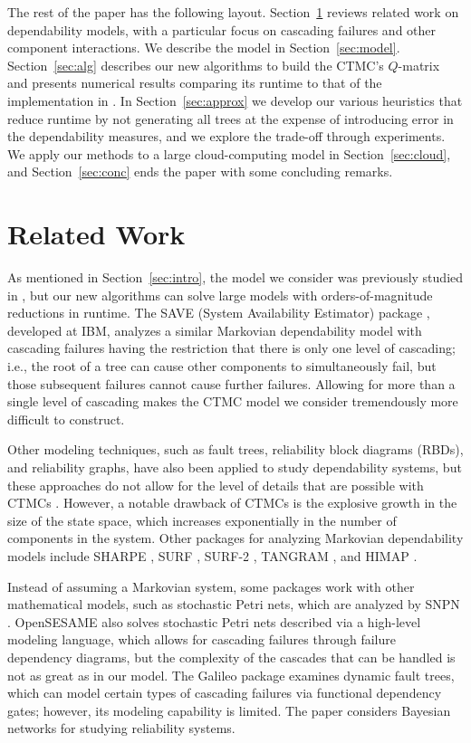 \documentclass[12pt]{article}
\begin{document}
The rest of the paper has the
following layout.
Section~\ref{sec:prior} reviews
related work on 
dependability models,
with a particular focus
on cascading failures
and other component interactions.
We describe the model
in Section~\ref{sec:model}.
Section~\ref{sec:alg} describes
our new algorithms to build
the CTMC's $Q$-matrix and presents
numerical results comparing its
runtime to that of the implementation
in \cite{ING:2009}.
In Section~\ref{sec:approx}
we develop our various heuristics
that reduce runtime by not
generating all trees at the
expense of introducing error
in the dependability measures,
and we explore the trade-off
through experiments.
We apply our methods to 
a large cloud-computing model
in Section~\ref{sec:cloud},
and Section~\ref{sec:conc}
ends the paper with some
concluding remarks.



\section{Related Work}
\label{sec:prior}

As mentioned in Section~\ref{sec:intro},
the model we consider was previously
studied in \cite{ING:2009}, but
our new algorithms can solve large
models with orders-of-magnitude
reductions in runtime.
The SAVE (System Availability Estimator)
package \cite{BHLNS:1994}, developed at IBM,
analyzes a similar Markovian dependability
model with cascading failures
having the restriction that there
is only one level of cascading;
i.e., the root of a tree can
cause other components to simultaneously
fail, but those subsequent failures
cannot cause further failures.
Allowing for more than a
single level of cascading
makes the CTMC model we consider
tremendously more
difficult to construct.

Other modeling techniques,
such as fault trees, reliability
block diagrams (RBDs), and reliability graphs,
have also been applied to study 
dependability systems, but these
approaches do not allow for 
the level of details that are
possible with CTMCs \cite{MFT:2000}.  
However,
a notable drawback of CTMCs is the
explosive growth in the size of the
state space, which increases exponentially
in the number of components in the system.
Other packages for analyzing Markovian
dependability models include
SHARPE \cite{STP:1996},
SURF \cite{Butl:1986},
SURF-2 \cite{SURF2:1993},
TANGRAM \cite{BSM:1991},
and HIMAP \cite{KGS:1996}.

Instead of assuming a Markovian
system, some packages work with
other mathematical models, such as
stochastic Petri nets,
which are analyzed by SNPN
\cite{HTT:2000}.
OpenSESAME \cite{WSB:2008}
also solves stochastic Petri nets
described via a high-level
modeling language, which allows
for cascading failures through
failure dependency diagrams,
but the complexity of the
cascades that can be handled is
not as great as in our model.
The Galileo package
\cite{SDC:1999}
examines dynamic fault trees,
which can model certain types
of cascading failures via
functional dependency gates;
however, its modeling capability
is limited.
The paper \cite{LaPo:2007}
considers Bayesian networks
for studying reliability systems.
\end{document}
